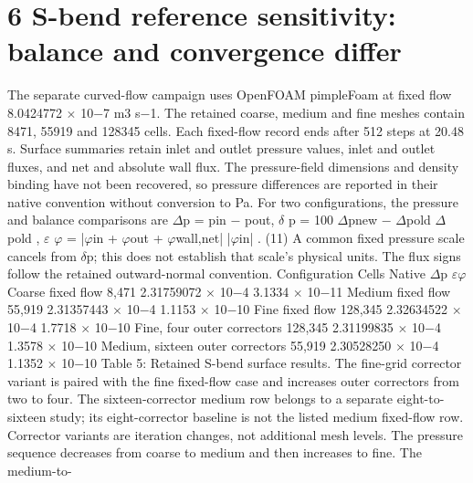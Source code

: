 \documentclass[11pt]{article}
\begin{document}
\section*{6 S-bend reference sensitivity: balance and convergence differ}

The separate curved-flow campaign uses OpenFOAM pimpleFoam at fixed flow 8.0424772 \ensuremath{\times} 10\ensuremath{-}7
m3 s\ensuremath{-}1. The retained coarse, medium and fine meshes contain 8471, 55919 and 128345 cells. Each
fixed-flow record ends after 512 steps at 20.48 s. Surface summaries retain inlet and outlet pressure
values, inlet and outlet fluxes, and net and absolute wall flux. The pressure-field dimensions
and density binding have not been recovered, so pressure differences are reported in their native
convention without conversion to Pa.
For two configurations, the pressure and balance comparisons are
\ensuremath{\Delta}p = pin \ensuremath{-} pout, \ensuremath{\delta} p = 100 \ensuremath{\Delta}pnew \ensuremath{-} \ensuremath{\Delta}pold
\ensuremath{\Delta}pold
, \ensuremath{\varepsilon} \ensuremath{\varphi} = |\ensuremath{\varphi}in + \ensuremath{\varphi}out + \ensuremath{\varphi}wall,net|
|\ensuremath{\varphi}in| . (11)
A common fixed pressure scale cancels from \ensuremath{\delta}p; this does not establish that scale’s physical units.
The flux signs follow the retained outward-normal convention.
Configuration Cells Native \ensuremath{\Delta}p \ensuremath{\varepsilon}\ensuremath{\varphi}
Coarse fixed flow 8,471 2.31759072 \ensuremath{\times} 10\ensuremath{-}4 3.1334 \ensuremath{\times} 10\ensuremath{-}11
Medium fixed flow 55,919 2.31357443 \ensuremath{\times} 10\ensuremath{-}4 1.1153 \ensuremath{\times} 10\ensuremath{-}10
Fine fixed flow 128,345 2.32634522 \ensuremath{\times} 10\ensuremath{-}4 1.7718 \ensuremath{\times} 10\ensuremath{-}10
Fine, four outer correctors 128,345 2.31199835 \ensuremath{\times} 10\ensuremath{-}4 1.3578 \ensuremath{\times} 10\ensuremath{-}10
Medium, sixteen outer correctors 55,919 2.30528250 \ensuremath{\times} 10\ensuremath{-}4 1.1352 \ensuremath{\times} 10\ensuremath{-}10
Table 5: Retained S-bend surface results. The fine-grid corrector variant is paired with the fine
fixed-flow case and increases outer correctors from two to four. The sixteen-corrector medium row
belongs to a separate eight-to-sixteen study; its eight-corrector baseline is not the listed medium
fixed-flow row. Corrector variants are iteration changes, not additional mesh levels.
The pressure sequence decreases from coarse to medium and then increases to fine. The medium-to-
\end{document}
